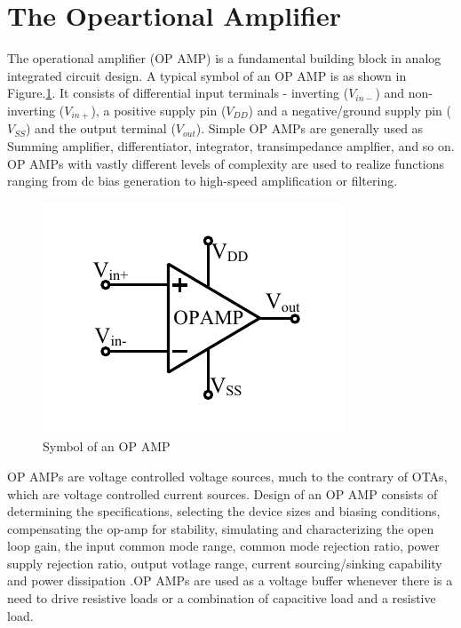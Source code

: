 \vfill
\clearpage

\section{The Opeartional Amplifier}
The operational amplifier (OP AMP) is a fundamental building block in analog integrated circuit design. A typical symbol of an OP AMP is as shown in Figure.\ref{fig:OPAMP_symbol}. It consists of differential input terminals - inverting ($V_{in-}$) and non-inverting ($V_{in+}$), a positive supply pin ($V_{DD}$) and a negative/ground supply pin ($V_{SS}$) and the output terminal ($V_{out}$). Simple OP AMPs are generally used as Summing amplifier, differentiator, integrator, transimpedance amplfier, and so on. OP AMPs with vastly different levels of complexity are used to realize functions ranging from dc bias generation to high-speed amplification or filtering.

\begin{figure} [H]
\centering
\includegraphics[scale=1]{Figures/System_Level/OPAMP_Symbol.pdf}
\caption{Symbol of an OP AMP}
\label{fig:OPAMP_symbol}
\end{figure}

OP AMPs are voltage controlled voltage sources, much to the contrary of OTAs, which are voltage controlled current sources. Design of an OP AMP consists of determining the specifications, selecting the device sizes and biasing conditions, compensating the op-amp for stability, simulating and characterizing the open loop gain, the input common mode range, common mode rejection ratio, power supply rejection ratio, output votlage range, current sourcing/sinking capability and power dissipation \cite{razavi_book}.OP AMPs are used as a voltage buffer whenever there is a need to drive resistive loads or a combination of capacitive load and a resistive load.

